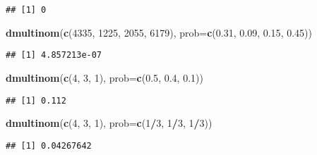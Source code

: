 \documentclass[]{article}
\newenvironment{Shaded}{\begin{snugshade}}{\end{snugshade}}
\newcommand{\KeywordTok}[1]{\textcolor[rgb]{0.13,0.29,0.53}{\textbf{#1}}}
\newcommand{\DataTypeTok}[1]{\textcolor[rgb]{0.13,0.29,0.53}{#1}}
\newcommand{\DecValTok}[1]{\textcolor[rgb]{0.00,0.00,0.81}{#1}}
\newcommand{\FloatTok}[1]{\textcolor[rgb]{0.00,0.00,0.81}{#1}}
\newcommand{\OperatorTok}[1]{\textcolor[rgb]{0.81,0.36,0.00}{\textbf{#1}}}
\newcommand{\NormalTok}[1]{#1}
\begin{document}
\begin{verbatim}
## [1] 0
\end{verbatim}

\begin{Shaded}
\begin{Highlighting}[]
\KeywordTok{dmultinom}\NormalTok{(}\KeywordTok{c}\NormalTok{(}\DecValTok{4335}\NormalTok{, }\DecValTok{1225}\NormalTok{, }\DecValTok{2055}\NormalTok{, }\DecValTok{6179}\NormalTok{), }\DataTypeTok{prob=}\KeywordTok{c}\NormalTok{(}\FloatTok{0.31}\NormalTok{, }\FloatTok{0.09}\NormalTok{, }\FloatTok{0.15}\NormalTok{, }\FloatTok{0.45}\NormalTok{))}
\end{Highlighting}
\end{Shaded}

\begin{verbatim}
## [1] 4.857213e-07
\end{verbatim}

\begin{Shaded}
\begin{Highlighting}[]
\KeywordTok{dmultinom}\NormalTok{(}\KeywordTok{c}\NormalTok{(}\DecValTok{4}\NormalTok{, }\DecValTok{3}\NormalTok{, }\DecValTok{1}\NormalTok{), }\DataTypeTok{prob=}\KeywordTok{c}\NormalTok{(}\FloatTok{0.5}\NormalTok{, }\FloatTok{0.4}\NormalTok{, }\FloatTok{0.1}\NormalTok{))}
\end{Highlighting}
\end{Shaded}

\begin{verbatim}
## [1] 0.112
\end{verbatim}

\begin{Shaded}
\begin{Highlighting}[]
\KeywordTok{dmultinom}\NormalTok{(}\KeywordTok{c}\NormalTok{(}\DecValTok{4}\NormalTok{, }\DecValTok{3}\NormalTok{, }\DecValTok{1}\NormalTok{), }\DataTypeTok{prob=}\KeywordTok{c}\NormalTok{(}\DecValTok{1}\OperatorTok{/}\DecValTok{3}\NormalTok{, }\DecValTok{1}\OperatorTok{/}\DecValTok{3}\NormalTok{, }\DecValTok{1}\OperatorTok{/}\DecValTok{3}\NormalTok{))}
\end{Highlighting}
\end{Shaded}

\begin{verbatim}
## [1] 0.04267642
\end{verbatim}

\begin{Shaded}
\end{Shaded}
\end{document}
